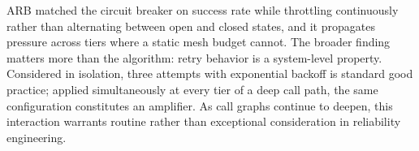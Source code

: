 \documentclass[conference]{IEEEtran}
\begin{document}
ARB matched the circuit breaker on success rate while throttling continuously rather than alternating between open and closed states, and it propagates pressure across tiers where a static mesh budget cannot. The broader finding matters more than the algorithm: retry behavior is a system-level property. Considered in isolation, three attempts with exponential backoff is standard good practice; applied simultaneously at every tier of a deep call path, the same configuration constitutes an amplifier. As call graphs continue to deepen, this interaction warrants routine rather than exceptional consideration in reliability engineering.

\balance



\end{document}
